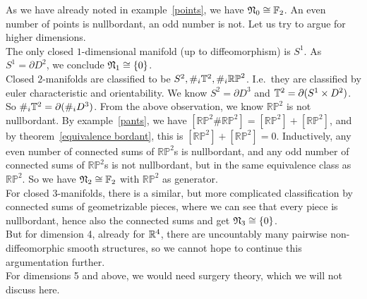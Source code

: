 \documentclass[a4paper,11pt]{article}
\begin{document}

As we have already noted in example\ \ref{points}, we have \(\mathfrak{N}_0\cong\mathbb{F}_2\). An even number of points is nullbordant, an odd number is not. Let us try to argue for higher dimensions.\\
The only closed \(1\)-dimensional manifold (up to diffeomorphism) is \(S^1\). As \(S^1=\partial D^2\), we conclude \(\mathfrak{N}_1\cong \{0\}\).\\
Closed \(2\)-manifolds are classified to be \(S^2, \#_i\mathbb{T}^2, \#_i\mathbb{RP}^2\). I.e.\ they are classified by euler characteristic and orientability. We know \(S^2=\partial D^3\) and \(\mathbb{T}^2=\partial (S^1\times D^2)\). So \(\#_i\mathbb{T}^2=\partial(\#_i D^3)\). From the above observation, we know \(\mathbb{RP}^2\) is not nullbordant. 
By example\ \ref{pants}, we have \([\mathbb{RP}^2\#\mathbb{RP}^2]=[\mathbb{RP}^2]+[\mathbb{RP}^2]\), and by theorem\ \ref{equivalence bordant}, this is \([\mathbb{RP}^2]+[\mathbb{RP}^2]=0\). Inductively, any even number of connected sums of \(\mathbb{RP}^2\)s is nullbordant, and any odd number of connected sums of \(\mathbb{RP}^2\)s is not nullbordant, but in the same equivalence class as \(\mathbb{RP}^2\). So we have \(\mathfrak{N}_2\cong\mathbb{F}_2\) with \(\mathbb{RP}^2\) as generator.\\
For closed \(3\)-manifolds, there is a similar, but more complicated classification by connected sums of geometrizable pieces, where we can see that every piece is nullbordant, hence also the connected sums and get \(\mathfrak{N}_3\cong \{0\}\).\\
But for dimension 4, already for \(\mathbb{R}^4\), there are uncountably many pairwise non-diffeomorphic smooth structures, so we cannot hope to continue this argumentation further.\\
For dimensions 5 and above, we would need surgery theory, which we will not discuss here.
\end{document}

